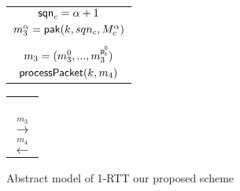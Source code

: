 \begin{figure*}[!htp]
\begin{center}
\begin{enumerate}
{\begin{minipage}[t]{0.38\textwidth}
\begin{tabular}{c}
    $\mathsf{sqn}_c = \alpha + 1$ \\
    $m_3^{\alpha} = \mathsf{pak}(k, sqn_c, M_c^{\alpha})$ \\
    $ $ \\
    $m_3 = (m_3^{0},...,m_3^{\mathsf{p_c^{0}}})$ \\
    $\mathsf{processPacket}(k, m_4)$ \\
   \end{tabular}
  \end{minipage}%
 }
 \begin{minipage}[t]{0.13\textwidth}
  \centering
  \begin{tabular}{c}
   $ $ \\
   $ $ \\
   $ $ \\
   $ $ \\
   $\xrightarrow{m_3}$ \\
   $\xleftarrow{m_4}$ \\
  \end{tabular}
 \end{minipage}%
\end{enumerate}

 \caption{Abstract model of 1-RTT our proposed scheme}\label{fig:quic_prop_1rtt}
 \end{center}
\end{figure*}